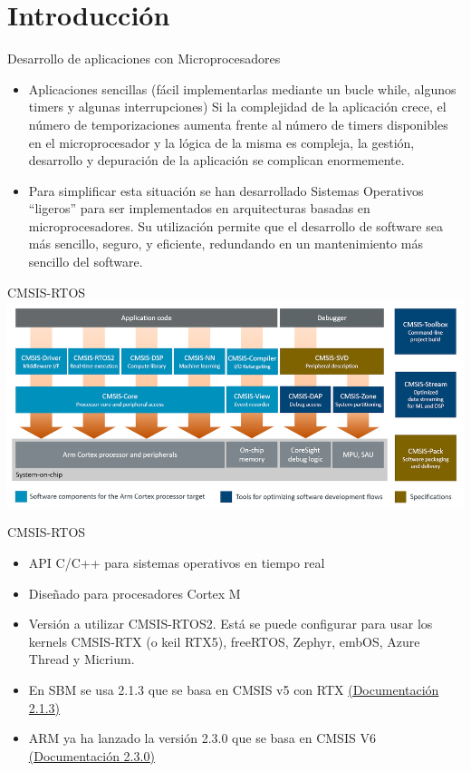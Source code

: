 \section{Introducción}

\begin{frame}{Desarrollo de aplicaciones con Microprocesadores}
    \begin{itemize}
        \item Aplicaciones sencillas (fácil implementarlas mediante un bucle while, algunos timers y algunas interrupciones)
Si la complejidad de la aplicación crece, el número de temporizaciones aumenta frente al número de timers disponibles en el microprocesador y la lógica de la misma es compleja, la gestión, desarrollo y depuración de la aplicación se complican enormemente.
        \item Para simplificar esta situación se han desarrollado Sistemas Operativos “ligeros” para ser implementados en arquitecturas basadas en microprocesadores. Su utilización permite que el desarrollo de software sea más sencillo, seguro, y eficiente, redundando en un mantenimiento más sencillo del software.      
    \end{itemize}
     \centering

\end{frame}

\begin{frame}{CMSIS-RTOS}
    \includegraphics[scale=0.35]{presentation/cmsis_components.png}
\end{frame}

\begin{frame}{CMSIS-RTOS}
    \begin{itemize}
      \item API C/C++ para sistemas operativos en tiempo real
      \item Diseñado para procesadores Cortex M
      \item Versión a utilizar CMSIS-RTOS2. Está se puede configurar para usar los kernels CMSIS-RTX (o keil RTX5), freeRTOS, Zephyr, embOS, Azure Thread y Micrium.
      \item En SBM se usa 2.1.3 que se basa en CMSIS v5 con RTX \href{https://arm-software.github.io/CMSIS_5/RTOS2/html/index.html}{(Documentación 2.1.3)}
      \item ARM ya ha lanzado la versión 2.3.0 que se basa en CMSIS V6 \href{https://arm-software.github.io/CMSIS_6/latest/RTOS2/index.html}{(Documentación 2.3.0)}
    \end{itemize}
    
\end{frame}

